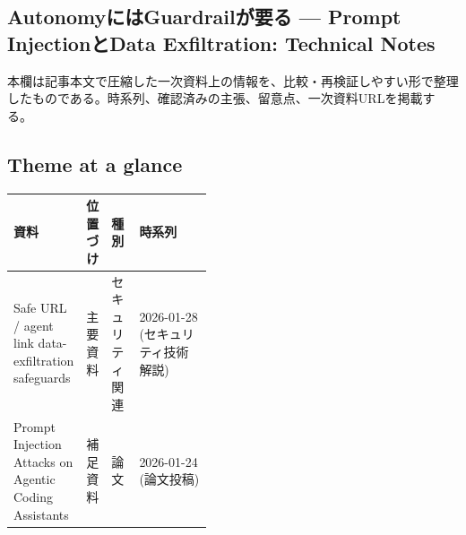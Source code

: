\subsection*{AutonomyにはGuardrailが要る — Prompt InjectionとData Exfiltration: Technical Notes}
本欄は記事本文で圧縮した一次資料上の情報を、比較・再検証しやすい形で整理したものである。時系列、確認済みの主張、留意点、一次資料URLを掲載する。
\medskip
\subsection*{Theme at a glance}
\begin{center}
\footnotesize
\begin{tabularx}{\linewidth}{@{}p{0.20\linewidth}p{0.10\linewidth}p{0.14\linewidth}X@{}}
\toprule
資料 & 位置づけ & 種別 & 時系列 \\
\midrule
Safe URL / agent link data-exfiltration safeguards & 主要資料 & セキュリティ関連 & 2026-01-28 (セキュリティ技術解説) \\
Prompt Injection Attacks on Agentic Coding Assistants & 補足資料 & 論文 & 2026-01-24 (論文投稿) \\
\bottomrule
\end{tabularx}
\end{center}
\normalsize

